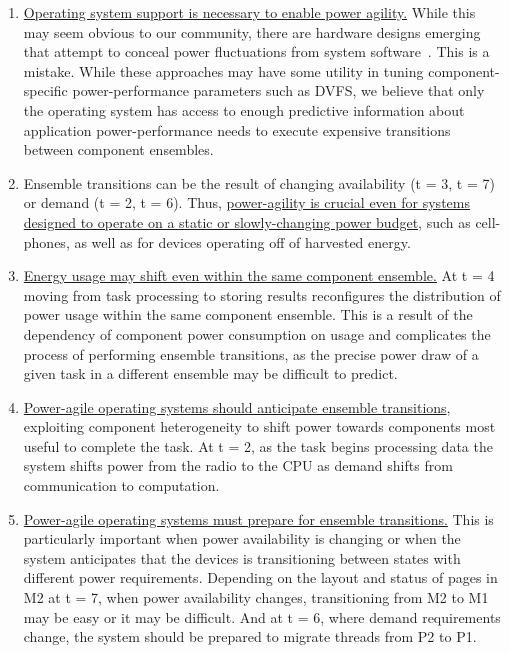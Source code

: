 \begin{enumerate}

\item \uline{Operating system support is necessary to enable power agility.}
While this may seem obvious to our community, there are hardware designs
emerging that attempt to conceal power fluctuations from system
software~\cite{rangan-threadmotion}. This is a mistake. While these
approaches may have some utility in tuning component-specific
power-performance parameters such as DVFS, we believe that only the operating
system has access to enough predictive information about application
power-performance needs to execute expensive transitions between component
ensembles.

\item Ensemble transitions can be the result of changing availability (t = 3,
t = 7) or demand (t = 2, t = 6). Thus, \uline{power-agility is crucial even
for systems designed to operate on a static or slowly-changing power budget},
such as cell-phones, as well as for devices operating off of harvested
energy.

\item \uline{Energy usage may shift even within the same component ensemble.}
At t = 4 moving from task processing to storing results reconfigures the
distribution of power usage within the same component ensemble. This is a
result of the dependency of component power consumption on usage and
complicates the process of performing ensemble transitions, as the precise
power draw of a given task in a different ensemble may be difficult to
predict.

\item \uline{Power-agile operating systems should anticipate ensemble
transitions}, exploiting component heterogeneity to shift power towards
components most useful to complete the task. At t = 2, as the task begins
processing data the system shifts power from the radio to the CPU as demand
shifts from communication to computation.

\item \uline{Power-agile operating systems must prepare for ensemble
transitions.} This is particularly important when power availability is
changing or when the system anticipates that the devices is transitioning
between states with different power requirements. Depending on the layout and
status of pages in M2 at t = 7, when power availability changes,
transitioning from M2 to M1 may be easy or it may be difficult. And at t = 6,
where demand requirements change, the system should be prepared to migrate
threads from P2 to P1.

\end{enumerate}
